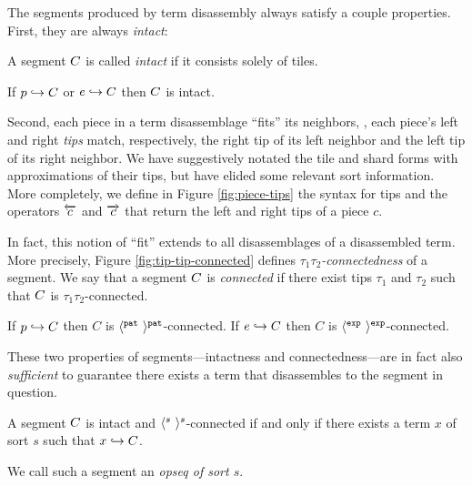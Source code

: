 

The segments produced by term disassembly always satisfy
a couple properties. First, they are always \emph{intact}:
\begin{definition}
  A segment $C$ is called \emph{intact} if it consists
  solely of tiles.
\end{definition}
\begin{lemma}
  If $p\hookrightarrow C$ or $e\hookrightarrow C$ then $C$ is intact.
\end{lemma}

Second, each piece in a term disassemblage ``fits''
its neighbors, \ie, each piece's left and right \emph{tips}
match, respectively, the right tip of its left neighbor
and the left tip of its right neighbor.
We have suggestively notated the tile and shard forms with
approximations of their tips, but have elided some relevant
sort information.
More completely, we define in Figure \ref{fig:piece-tips}
the syntax for tips and the operators $\overleftarrow{c}$
and $\overrightarrow{c}$ that return the left and right tips
of a piece $c$.

In fact, this notion of ``fit'' extends to all disassemblages
of a disassembled term. 
More precisely, Figure \ref{fig:tip-tip-connected} defines
\emph{$\tau_1\tau_2$-connectedness} of a segment.
We say that a segment $C$ is \emph{connected} if there exist
tips $\tau_1$ and $\tau_2$ such that $C$ is $\tau_1\tau_2$-connected.

\begin{lemma}
  If $p\hookrightarrow C$ then $C$ is $\langle^{\texttt{pat}}~\rangle^{\texttt{pat}}$-connected.
  If $e\hookrightarrow C$ then $C$ is $\langle^{\texttt{exp}}~\rangle^{\texttt{exp}}$-connected.
\end{lemma}




These two properties of segments---intactness
and connectedness---are in fact also \emph{sufficient} to
guarantee there exists a term that disassembles to
the segment in question.

\begin{theorem} \label{thm:term-parseability}
  A segment $C$ is intact and $\langle^{s}~\rangle^{s}$-connected
  if and only if there exists a term $x$ of sort $s$ such that
  $x\hookrightarrow C$.
\end{theorem}
\noindent
We call such a segment an \emph{opseq of sort $s$}.

